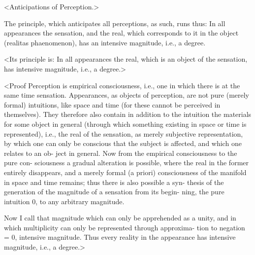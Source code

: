 <Anticipations of Perception.>

The principle, which anticipates all perceptions, as such,
runs thus: In all appearances the sensation, and the real,
which corresponds to it in the object (realitas
phaenomenon), has an intensive magnitude, i.e., a degree.

<Its principle is: In all appearances the real, which is an object
of the sensation, has intensive magnitude, i.e., a degree.>

<Proof
Perception is empirical consciousness, i.e., one in which there is at the
same time sensation. Appearances, as objects of perception, are not
pure (merely formal) intuitions, like space and time (for these cannot be
perceived in themselves). They therefore also contain in addition to the
intuition the materials for some object in general (through which
something existing in space or time is represented), i.e., the real of the
sensation, as merely subjective representation, by which one can only
be conscious that the subject is affected, and which one relates to an ob-
ject in general. Now from the empirical consciousness to the pure con-
sciousness a gradual alteration is possible, where the real in the former
entirely disappears, and a merely formal (a priori) consciousness of the
manifold in space and time remains; thus there is also possible a syn-
thesis of the generation of the magnitude of a sensation from its begin-
ning, the pure intuition 0, to any arbitrary magnitude.

Now I call that magnitude which can only be apprehended as a unity,
and in which multiplicity can only be represented through approxima-
tion to negation = 0, intensive magnitude. Thus every reality in the
appearance has intensive magnitude, i.e., a degree.>


